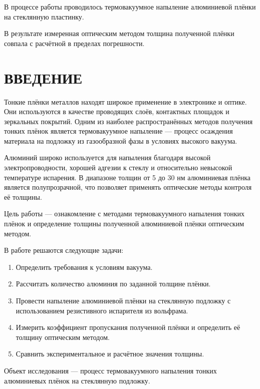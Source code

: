 \documentclass[a4paper, 14pt]{extarticle}
\begin{document}
	В процессе работы проводилось термовакуумное напыление алюминиевой плёнки на стеклянную пластинку.
	
	В результате измеренная оптическим методом толщина полученной плёнки совпала с расчётной в пределах погрешности.
	
	
	\tableofcontents
	
	
	\section*{ВВЕДЕНИЕ}
	
	\hspace{11mm} Тонкие плёнки металлов находят широкое применение в
	электронике и оптике. Они используются в качестве
	проводящих слоёв, контактных площадок и зеркальных покрытий. Одним из наиболее распространённых методов получения
	тонких плёнок является термовакуумное напыление --- процесс
	осаждения материала на подложку из газообразной фазы в условиях высокого
	вакуума.
	
	Алюминий широко используется для
	напыления благодаря высокой электропроводности, хорошей адгезии к
	стеклу и относительно невысокой температуре испарения. В диапазоне
	толщин от 5 до 30 нм алюминиевая плёнка является полупрозрачной, что
	позволяет применять оптические методы контроля её толщины.
	
	
	Цель работы --- ознакомление с методами термовакуумного
	напыления тонких плёнок и определение толщины полученной алюминиевой
	плёнки оптическим методом.
	
	В работе решаются следующие задачи:
	
	\begin{enumerate}
		\item Определить
		требования к условиям вакуума.
		\item Рассчитать количество алюминия по
		 заданной толщине плёнки.
		\item Провести напыление алюминиевой плёнки на стеклянную подложку
		с использованием резистивного испарителя из вольфрама.
		\item Измерить коэффициент пропускания полученной плёнки и
		определить её толщину оптическим методом.
		\item Сравнить экспериментальное  и расчётное значения толщины.
	\end{enumerate}
	
	Объект исследования --- процесс термовакуумного напыления
	тонких алюминиевых плёнок на стеклянную подложку.
	
\end{document}
